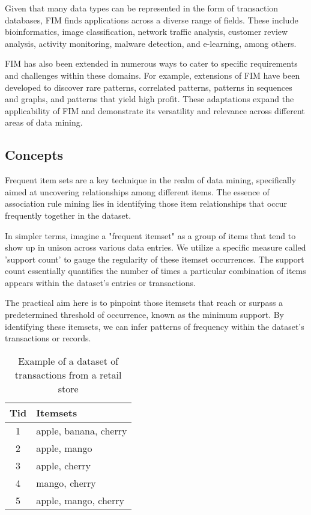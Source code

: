 Given that many data types can be represented in the form of transaction databases, FIM finds applications across a diverse range of fields. These include bioinformatics, image classification, network traffic analysis, customer review analysis, activity monitoring, malware detection, and e-learning, among others.

FIM has also been extended in numerous ways to cater to specific requirements and challenges within these domains. For example, extensions of FIM have been developed to discover rare patterns, correlated patterns, patterns in sequences and graphs, and patterns that yield high profit. These adaptations expand the applicability of FIM and demonstrate its versatility and relevance across different areas of data mining.

\subsection{Concepts}
Frequent item sets are a key technique in the realm of data mining\cite{FIM_geeksforgeeks},
specifically aimed at uncovering relationships among different items.
The essence of association rule mining lies in identifying those item relationships that occur frequently together in the dataset.

In simpler terms, imagine a "frequent itemset" as a group of items that tend to show up in unison across various data entries. We utilize a specific measure called 'support count' to gauge the regularity of these itemset occurrences. The support count essentially quantifies the number of times a particular combination of items appears within the dataset's entries or transactions.

The practical aim here is to pinpoint those itemsets that reach or surpass a predetermined threshold of occurrence, known as the minimum support. By identifying these itemsets, we can infer patterns of frequency within the dataset's transactions or records.

\begin{table}[H]
    \centering
    \caption{Example of a dataset of transactions from a retail store}
    \label{tab:example_dataset_in_real}
    \begin{tabular}{|c|l|}
        \hline
        \textbf{Tid} & \textbf{Itemsets}     \\
        \hline
        1            & apple, banana, cherry \\
        2            & apple, mango          \\
        3            & apple, cherry         \\
        4            & mango, cherry         \\
        5            & apple, mango, cherry  \\
        \hline
    \end{tabular}
\end{table}

